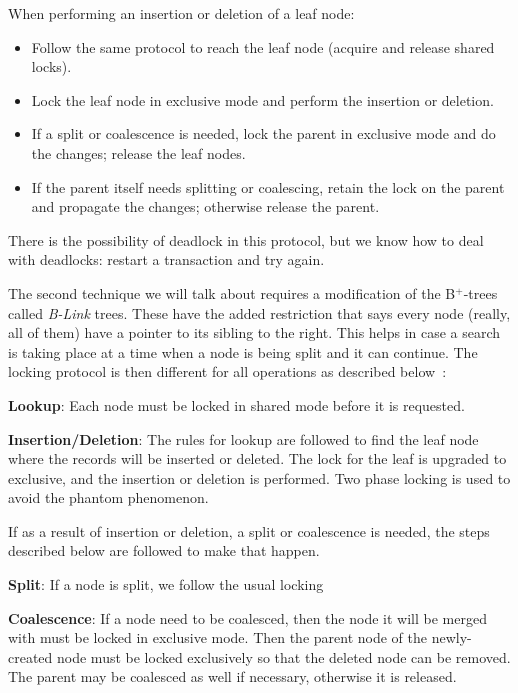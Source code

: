 When performing an insertion or deletion of a leaf node:
\begin{itemize}
	\item Follow the same protocol to reach the leaf node (acquire and release shared locks).
	\item Lock the leaf node in exclusive mode and perform the insertion or deletion.
	\item If a split or coalescence is needed, lock the parent in exclusive mode and do the changes; release the leaf nodes.
	\item If the parent itself needs splitting or coalescing, retain the lock on the parent and propagate the changes; otherwise release the parent.
\end{itemize}

There is the possibility of deadlock in this protocol, but we know how to deal with deadlocks: restart a transaction and try again.


The second technique we will talk about requires a modification of the B$^{+}$-trees called \textit{B-Link} trees. These have the added restriction that says every node (really, all of them) have a pointer to its sibling to the right. This helps in case a search is taking place at a time when a node is being split and it can continue. The locking protocol is then different for all operations as described below~\cite{dsc}:

\textbf{Lookup}: Each node must be locked in shared mode before it is requested. 

\textbf{Insertion/Deletion}: The rules for lookup are followed to find the leaf node where the records will be inserted or deleted. The lock for the leaf is upgraded to exclusive, and the insertion or deletion is performed. Two phase locking is used to avoid the phantom phenomenon.

If as a result of insertion or deletion, a split or coalescence is needed, the steps described below are followed to make that happen.

\textbf{Split}: If a node is split, we follow the usual locking 

\textbf{Coalescence}: If a node need to be coalesced, then the node it will be merged with must be locked in exclusive mode. Then the parent node of the newly-created node must be locked exclusively so that the deleted node can be removed. The parent may be coalesced as well if necessary, otherwise it is released.







